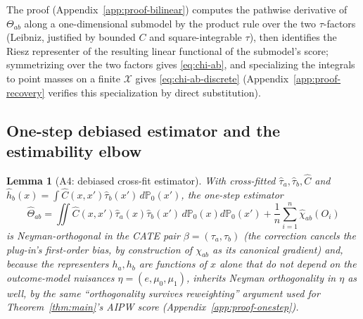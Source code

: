 \documentclass[11pt]{article}
\theoremstyle{plain}
\newtheorem{lemma}[theorem]{Lemma}
\theoremstyle{definition}
\theoremstyle{remark}
\newcommand{\PP}{\mathbb{P}}
\newcommand{\cX}{\mathcal{X}}
\begin{document}
The proof (Appendix~\ref{app:proof-bilinear}) computes the pathwise derivative of
$\Theta_{ab}$ along a one-dimensional submodel by the product rule over the two
$\tau$-factors (Leibniz, justified by bounded $C$ and square-integrable $\tau$), then
identifies the Riesz representer of the resulting linear functional of the submodel's
score; symmetrizing over the two factors gives \eqref{eq:chi-ab}, and specializing the
integrals to point masses on a finite $\cX$ gives \eqref{eq:chi-ab-discrete}
(Appendix~\ref{app:proof-recovery} verifies this specialization by direct
substitution).

\subsection{One-step debiased estimator and the estimability elbow}

\begin{lemma}[A4: debiased cross-fit estimator]\label{lem:onestep}
With cross-fitted $\hat\tau_a,\hat\tau_b,\hat C$ and
$\hat h_b(x)=\int\hat C(x,x')\hat\tau_b(x')\,d\PP_0(x')$, the one-step estimator
\begin{equation}\label{eq:onestep}
    \hat\Theta_{ab} = \iint \hat C(x,x')\hat\tau_a(x)\hat\tau_b(x')\,d\PP_0(x)d\PP_0(x')
        + \frac1n\sum_{i=1}^n\hat\chi_{ab}(O_i)
\end{equation}
is Neyman-orthogonal in the CATE pair $\beta=(\tau_a,\tau_b)$ (the correction cancels
the plug-in's first-order bias, by construction of $\chi_{ab}$ as its canonical
gradient) and, because the representers $h_a,h_b$ are functions of $x$ alone that do
not depend on the outcome-model nuisances $\eta=(e,\mu_0,\mu_1)$, inherits Neyman
orthogonality in $\eta$ as well, by the same ``orthogonality survives reweighting''
argument used for Theorem~\ref{thm:main}'s AIPW score (Appendix~\ref{app:proof-onestep}).
\end{lemma}
\end{document}
